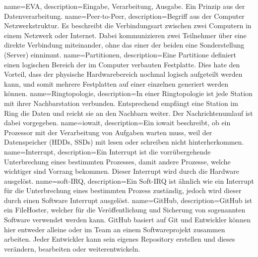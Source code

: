 {
  name=EVA,
  description={Eingabe, Verarbeitung, Ausgabe. Ein Prinzip aus der Datenverarbeitung.
}
{
  name=Peer-to-Peer,
  description={Begriff aus der Computer Netzwerkstruktur. Es beschreibt die
               Verbindungsart zwischen zwei Computern in einem Netzwerk oder
               Internet. Dabei kommunizieren zwei Teilnehmer über eine direkte
               Verbindung miteinander, ohne das einer der beiden eine
               Sonderstellung (Server) einnimmt.}
}
{
  name=Partitionen,
  description={Eine Partitione definiert einen logischen Bereich der im
               Computer verbauten Festplatte. Dies hate den Vorteil, dass
               der physische Hardwarebereich nochmal logisch aufgeteilt
               werden kann, und somit mehrere Festplatten auf einer einzelnen
               generiert werden können.}
}
{
  name=Ringtopologie,
  description={In einer Ringtopologie ist jede Station mit ihrer Nachbarstation
               verbunden. Entsprechend empfängt eine Station im Ring die Daten
               und reicht sie an den Nachbarn weiter. Der Nachrichtenumlauf ist
               dabei vorgegeben.}
}
{
  name=iowait,
  description={Ein iowait beschreibt, ob ein Prozessor mit der Verarbeitung von
              Aufgaben warten muss, weil der Datenspeicher (HDDs, SSDs) mit lesen
              oder schreiben nicht hinterherkommen.}
}
{
  name=Interrupt,
  description={Ein Interrupt ist die vorrübergehende Unterbrechung eines bestimmten
              Prozesses, damit andere Prozesse, welche wichtiger sind Vorrang bekommen.
              Dieser Interrupt wird durch die Hardware ausgelöst.}
}
{
  name=soft-IRQ,
  description={Ein Soft-IRQ ist ähnlich wie ein \gls{Interrupt} für die Unterbrechung
              eines bestimmten Prozess zuständig, jedoch wird dieser durch einen
              Software Interrupt ausgelöst.}
}
{
  name=GitHub,
  description={GitHub ist ein FileHoster, welcher für die Veröffentlichung und Sicherung
              von sogenannten Software verwendet
              werden kann. GitHub basiert auf \gls{Git} und Entwickler können hier
              entweder alleine oder im Team an einem Softwareprojekt zusammen arbeiten.
              Jeder Entwickler kann sein eigenes \gls{Repository} erstellen und dieses
              verändern, bearbeiten oder weiterentwickeln.}
}
}

